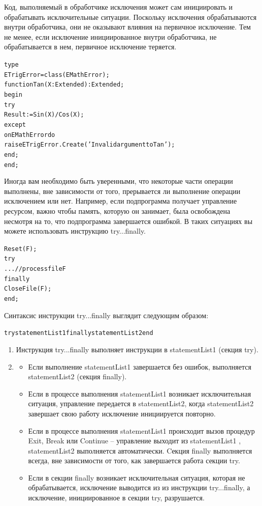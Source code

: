 \documentclass{beamer}
\begin{document}
\begin{frame}[fragile]
Код, выполняемый в обработчике исключения может сам инициировать и обрабатывать исключительные ситуации. Поскольку исключения обрабатываются внутри обработчика, они не оказывают влияния на первичное исключение. Тем не менее, если исключение инициированное внутри обработчика, не обрабатывается в нем, первичное исключение теряется.
\begin{alltt}
type
   ETrigError = class(EMathError);
   function Tan(X: Extended): Extended;
   begin
      try
        Result := Sin(X) / Cos(X);
      except
        on EMathError do
        raise ETrigError.Create('Invalid argument to Tan');
      end;
   end;
\end{alltt}
\end{frame}

\begin{frame}[fragile]
Иногда вам необходимо быть уверенными, что некоторые части операции выполнены, вне зависимости от того, прерывается ли выполнение операции исключением или нет. Например, если подпрограмма получает управление ресурсом, важно чтобы память, которую он занимает, была освобождена несмотря на то, что подпрограмма завершается ошибкой. В таких ситуациях вы можете использовать инструкцию try...finally.
\begin{alltt}
Reset(F);
try
   ... // process file F
finally
   CloseFile(F);
end;
\end{alltt}
\end{frame}

\begin{frame}[fragile]
Синтаксис инструкции try...finally выглядит следующим образом:
\begin{alltt}
try statementList1 finally statementList2 end
\end{alltt}
\begin{enumerate}
\item Инструкция try...finally выполняет инструкции в statementList1 (секция try). 
\item 
\begin{itemize}
\item Если выполнение statementList1 завершается без ошибок, выполняется statementList2 (секция finally). 
\item Если в процессе выполнения statementList1 возникает исключительная ситуация, управление передается в statementList2, когда statementList2 завершает свою работу исключение инициируется повторно. 
\item Если в процессе выполнения statementList1 происходит вызов процедур Exit, Break или Continue – управление выходит из statementList1 , statementList2 выполняется автоматически.
Cекция finally выполняется всегда, вне зависимости от того, как завершается работа секции try.
\item Если в секции finally возникает исключительная ситуация, которая не обрабатывается, исключение выводится из из инструкции try...finally, а исключение, инициированное в секции try, разрушается. 
\end{itemize}
\end{enumerate}
\end{frame}
\end{document}
